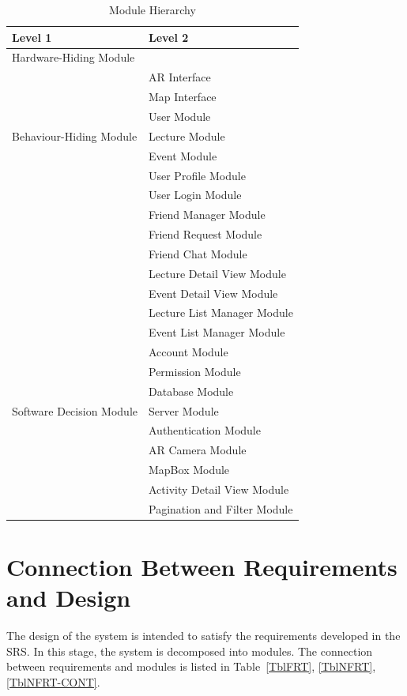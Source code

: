 \documentclass[12pt, titlepage]{article}
\begin{document}
\begin{table}[h!]
\centering
\begin{tabular}{p{} p{}}
\toprule
\textbf{Level 1} & \textbf{Level 2}\\
\midrule

{Hardware-Hiding Module} & ~ \\
\midrule

\multirow{7}{0.3\textwidth}{Behaviour-Hiding Module}
& AR Interface\\
& Map Interface\\
& User Module\\
& Lecture Module\\
& Event Module\\
& User Profile Module\\
& User Login Module\\
& Friend Manager Module\\ 
& Friend Request Module\\
& Friend Chat Module\\
& Lecture Detail View Module\\
& Event Detail View Module\\
& Lecture List Manager Module\\
& Event List Manager Module\\
& Account Module\\
& Permission Module\\
\midrule

\multirow{3}{0.3\textwidth}{Software Decision Module}
& Database Module\\
& Server Module\\
& Authentication Module\\
& AR Camera Module\\
& MapBox Module\\
& Activity Detail View Module\\
& Pagination and Filter Module\\
\bottomrule

\end{tabular}
\caption{Module Hierarchy}
\label{TblMH}
\end{table}

\section{Connection Between Requirements and Design} \label{SecConnection}

The design of the system is intended to satisfy the requirements developed in
the SRS. In this stage, the system is decomposed into modules. The connection
between requirements and modules is listed in Table~\ref{TblFRT}, \ref{TblNFRT}, \ref{TblNFRT-CONT}.
\end{document}
